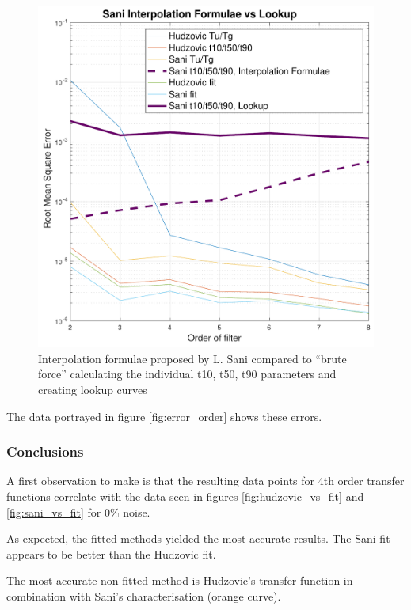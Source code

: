 \begin{figure}
    \includegraphics[width=\linewidth]{images/sani_interpolation_vs_lookup}
    \caption{Interpolation formulae proposed by L. Sani compared to ``brute force'' calculating the individual t10, t50, t90 parameters and creating lookup curves}
    \label{fig:interpolation_vs_lookup}
\end{figure}

The data portrayed in figure \ref{fig:error_order} shows these errors.

\subsubsection*{Conclusions}

A first observation to make is that the resulting  data  points  for  4th  order
transfer    functions    correlate    with    the    data   seen   in    figures
\ref{fig:hudzovic_vs_fit}    and    \ref{fig:sani_vs_fit}   for    0\%    noise.

As expected, the fitted methods  yielded the most accurate results. The Sani fit
appears  to be better than the Hudzovic fit.

The  most  accurate  non-fitted  method  is  Hudzovic's   transfer  function  in
combination with Sani's characterisation (orange curve).

